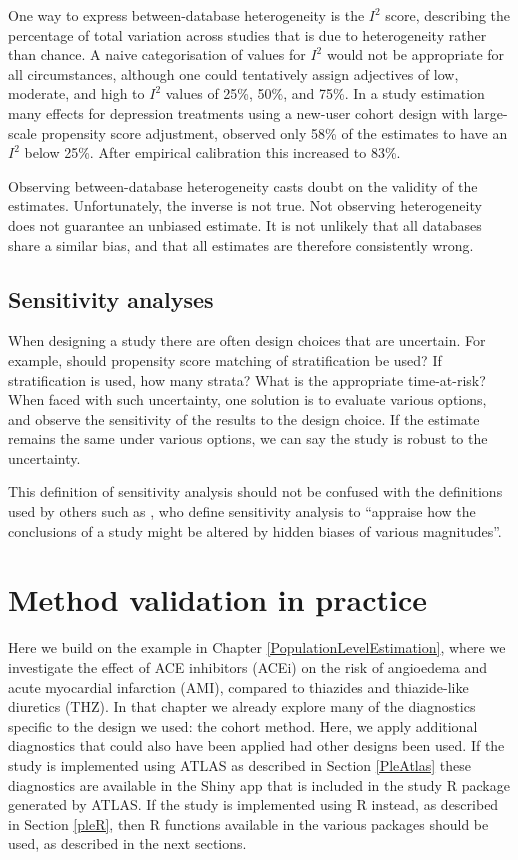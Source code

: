 \documentclass[11pt]{book}
\let\BeginKnitrBlock\begin \let\EndKnitrBlock\end
\begin{document}
One way to express between-database heterogeneity is the \(I^2\) score,
describing the percentage of total variation across studies that is due
to heterogeneity rather than chance. \citep{higgins_2003} A naive
categorisation of values for \(I^2\) would not be appropriate for all
circumstances, although one could tentatively assign adjectives of low,
moderate, and high to \(I^2\) values of 25\%, 50\%, and 75\%. In a study
estimation many effects for depression treatments using a new-user
cohort design with large-scale propensity score adjustment,
\citet{schuemie_2018b} observed only 58\% of the estimates to have an
\(I^2\) below 25\%. After empirical calibration this increased to 83\%.

\BeginKnitrBlock{rmdimportant}
Observing between-database heterogeneity casts doubt on the validity of
the estimates. Unfortunately, the inverse is not true. Not observing
heterogeneity does not guarantee an unbiased estimate. It is not
unlikely that all databases share a similar bias, and that all estimates
are therefore consistently wrong.
\EndKnitrBlock{rmdimportant}

\subsection{Sensitivity analyses}\label{sensitivity-analyses}

When designing a study there are often design choices that are
uncertain. For example, should propensity score matching of
stratification be used? If stratification is used, how many strata? What
is the appropriate time-at-risk? When faced with such uncertainty, one
solution is to evaluate various options, and observe the sensitivity of
the results to the design choice. If the estimate remains the same under
various options, we can say the study is robust to the uncertainty.

This definition of sensitivity analysis should not be confused with the
definitions used by others such as \citet{rosenbaum_2005}, who define
sensitivity analysis to ``appraise how the conclusions of a study might
be altered by hidden biases of various magnitudes''.

\section{Method validation in
practice}\label{method-validation-in-practice}

Here we build on the example in Chapter \ref{PopulationLevelEstimation},
where we investigate the effect of ACE inhibitors (ACEi) on the risk of
angioedema and acute myocardial infarction (AMI), compared to thiazides
and thiazide-like diuretics (THZ). In that chapter we already explore
many of the diagnostics specific to the design we used: the cohort
method. Here, we apply additional diagnostics that could also have been
applied had other designs been used. If the study is implemented using
ATLAS as described in Section \ref{PleAtlas} these diagnostics are
available in the Shiny app that is included in the study R package
generated by ATLAS. If the study is implemented using R instead, as
described in Section \ref{pleR}, then R functions available in the
various packages should be used, as described in the next sections.
\end{document}
